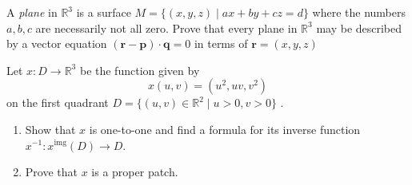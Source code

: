 \documentclass[12 pt, letterpaper]{hmcpset}
\begin{document}
\pagebreak

\begin{problem}[Problem 4.]
	A \textit{plane} in $\mathbb{R}^{3}$ is a surface $M = \{ (x, y, z) \mid ax + by + cz = d \}$ where the numbers $a, b, c$ are necessarily not all zero. Prove that every plane in $\mathbb{R}^{3}$ may be described by a vector equation $(\mathbf{r} - \mathbf{p}) \cdot \mathbf{q} = 0$ in terms of $\mathbf{r} = (x, y, z)$
\end{problem}

\pagebreak

\begin{problem}[Problem 5.]
	Let $x : D \to \mathbb{R}^{3}$  be the function given by
	\[
		x(u, v) = (u^{2}, uv, v^{2})
	\]
	on the first quadrant $D = \{ (u, v) \in \mathbb{R}^{2} \mid u > 0, v > 0 \}$ .
	\begin{enumerate}
		\item Show that $x$ is one-to-one and find a formula for its inverse function $x^{-1} : x^{\text{img}}(D) \to D$.
		\item Prove that $x$ is a proper patch.
	\end{enumerate}
\end{problem}
\end{document}
